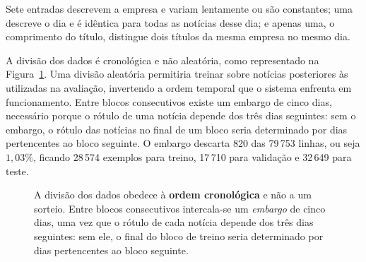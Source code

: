 Sete entradas descrevem a empresa e variam lentamente ou são constantes; uma descreve o dia e é
idêntica para todas as notícias desse dia; e apenas uma, o comprimento do título, distingue dois
títulos da mesma empresa no mesmo dia.

A divisão dos dados é cronológica e não aleatória, como representado na
Figura~\ref{fig:met_divisao}. Uma divisão aleatória permitiria treinar sobre notícias posteriores
às utilizadas na avaliação, invertendo a ordem temporal que o sistema enfrenta em funcionamento.
Entre blocos consecutivos existe um embargo de cinco dias, necessário porque o rótulo de uma
notícia depende dos três dias seguintes: sem o embargo, o rótulo das notícias no final de um bloco
seria determinado por dias pertencentes ao bloco seguinte. O embargo descarta 820 das 79\,753
linhas, ou seja $1{,}03\%$, ficando 28\,574 exemplos para treino, 17\,710 para validação e 32\,649
para teste.

\begin{figure}[ht]
\centering
{}
\caption[Divisão temporal com embargo]{A divisão dos dados obedece à \textbf{ordem cronológica} e
não a um sorteio. Entre blocos consecutivos intercala-se um \emph{embargo} de cinco dias, uma vez
que o rótulo de cada notícia depende dos três dias seguintes: sem ele, o final do bloco de treino
seria determinado por dias pertencentes ao bloco seguinte.}
\label{fig:met_divisao}
\end{figure}

